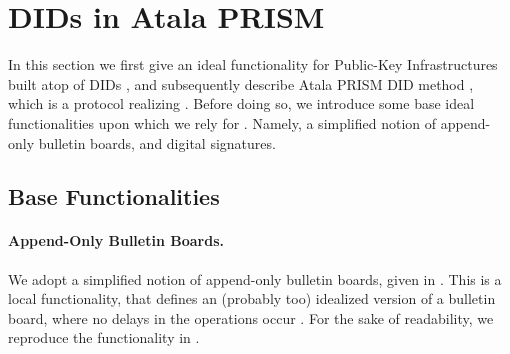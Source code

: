 \section{DIDs in Atala PRISM}
\label{sec:did-atala}

In this section we first give an ideal functionality for Public-Key
Infrastructures built atop of DIDs \IdealFPKIDID, and subsequently describe
Atala PRISM DID method \RealPKIDIDAtala, which is a protocol realizing
\IdealFPKIDID.
%
Before doing so, we introduce some base ideal functionalities upon which we
rely for \RealPKIDIDAtala. Namely, a simplified notion of append-only bulletin
boards, and digital signatures.

\subsection{Base Functionalities}
\label{ssec:did-funcs}

\paragraph{Append-Only Bulletin Boards.} %
We adopt a simplified notion of append-only bulletin boards, given in
\cite{acc+20}. This is a local functionality, that defines an (probably too)
idealized version of a bulletin board, where no delays in the operations
occur . For the sake of readability, we reproduce
the functionality in .

